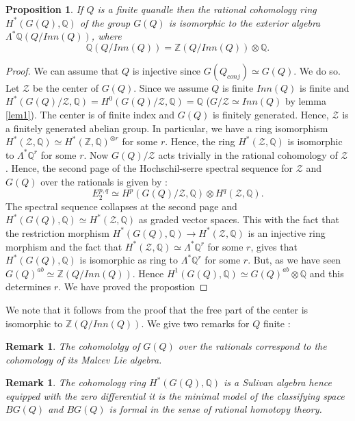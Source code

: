 \documentclass[12pt, reqno]{amsart}
\newtheorem{proposition}[theorem]{Proposition}
\newtheorem{remark}[theorem]{Remark}
\newcommand{\Z}{ {\mathbb Z} }
\begin{document}
\begin{proposition}
If $Q$ is a finite quandle then the rational cohomology ring $H^*(G(Q),\mathbb{Q})$ of the group $G(Q)$  is isomorphic to the exterior algebra $\Lambda^*\mathbb{Q}(Q/Inn(Q))$, where $$\mathbb{Q}(Q/Inn(Q))=\Z(Q/Inn(Q))\otimes \mathbb{Q}.$$
\end{proposition}
\begin{proof}
We can assume that $Q$ is injective since $G(Q_{conj})\simeq G(Q)$. We do so. Let $\mathcal{Z}$  be the center of $G(Q)$.  Since we assume $Q$ is finite $Inn(Q)$ is finite and $H^*(G(Q)/\mathcal{Z},\mathbb{Q})=H^0(G(Q)/\mathcal{Z},\mathbb{Q})=\mathbb{Q}$ ($G/\mathcal{Z}\simeq Inn(Q)$ by lemma \ref{lem1}). The center is of finite index and $G(Q)$ is finitely generated. Hence, $\mathcal{Z}$ is a finitely generated abelian group. In particular, we have a ring isomorphism $H^*(\mathcal{Z},\mathbb{Q})\simeq H^*(\Z, \mathbb{Q})^{\otimes r}$ for some $r$. Hence, the ring $H^*(\mathcal{Z},\mathbb{Q}) $ is isomorphic to $\Lambda^* \mathbb{Q}^r$ for some $r$. Now $G(Q)/\mathcal{Z} $ acts trivially in the rational cohomology of $\mathcal{Z}$. Hence, the second page of the Hochschil-serre spectral sequence for $\mathcal{Z}$ and $G(Q)$  over the rationals is given by :
$$E_2^{p,q}\simeq H^p(G(Q)/\mathcal{Z},\mathbb{Q})\otimes H^q(\mathcal{Z},\mathbb{Q}).$$
The spectral sequence collapses at the second page and $H^*(G(Q),\mathbb{Q})\simeq H^*(\mathcal{Z},\mathbb{Q})$ as graded vector spaces.  This with the fact that the restriction morphism $H^*(G(Q),\mathbb{Q})\to H^*(\mathcal{Z},\mathbb{Q})$ is an injective ring morphism and the fact that $ H^*(\mathcal{Z},\mathbb{Q})\simeq \Lambda^* \mathbb{Q}^r$ for some $r$, gives that $H^*(G(Q),\mathbb{Q})$ is isomorphic as ring to $\Lambda^* \mathbb{Q}^r$ for some $r$.  But, as we have seen $G(Q)^{ab}\simeq \Z(Q/Inn(Q))$. Hence $H^1(G(Q),\mathbb{Q})\simeq G(Q)^{ab}\otimes \mathbb{Q}$ and this determines $r$. We have proved the propostion
\end{proof}
We note that it follows from the proof that the free part of the center is isomorphic to $\Z(Q/Inn(Q))$. We give two remarks for $Q$ finite :
\begin{remark}
The cohomololgy of $G(Q)$ over the rationals correspond to the cohomology of its Malcev Lie algebra.
\end{remark}
\begin{remark}
The cohomology ring $H^*(G(Q),\mathbb{Q})$ is a Sulivan algebra hence equipped with the zero differential it is the minimal model of the classifying space $BG(Q)$ and $BG(Q)$ is formal in the sense of rational homotopy theory. 
\end{remark}
\end{document}
